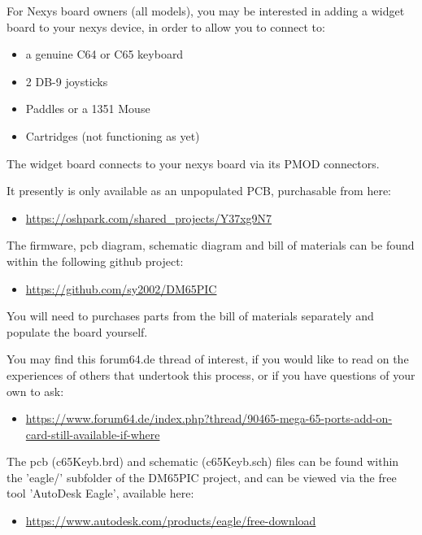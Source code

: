 For Nexys board owners (all models), you may be interested in adding a widget board to your nexys device, in order to allow you to connect to:

\begin{itemize}
  \item{a genuine C64 or C65 keyboard}
  \item{2 DB-9 joysticks}
  \item{Paddles or a 1351 Mouse}
  \item{Cartridges (not functioning as yet)}
\end{itemize}

The widget board connects to your nexys board via its PMOD connectors.

It presently is only available as an unpopulated PCB, purchasable from here:

\begin{itemize}
  \item \url{https://oshpark.com/shared\_projects/Y37xg9N7}
\end{itemize}

The firmware, pcb diagram, schematic diagram and bill of materials can be found within the following github project:

\begin{itemize}
  \item \url{https://github.com/sy2002/DM65PIC}
\end{itemize}

You will need to purchases parts from the bill of materials separately and populate the board yourself.

You may find this forum64.de thread of interest, if you would like to read on the experiences of others that undertook this process, or if you have questions of your own to ask:

\begin{itemize}
  \item \url{https://www.forum64.de/index.php?thread/90465-mega-65-ports-add-on-card-still-available-if-where}
\end{itemize}

The pcb (c65Keyb.brd) and schematic (c65Keyb.sch) files can be found within the 'eagle/' subfolder of the DM65PIC project, and can be viewed via the free tool 'AutoDesk Eagle', available here:

\begin{itemize}
  \item \url{https://www.autodesk.com/products/eagle/free-download}
\end{itemize}

